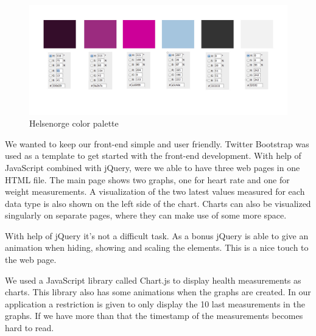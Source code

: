 \begin{figure}[h]
\centering
\includegraphics[scale=0.30]{../Figures/helsenorge_pallett.jpg}
\caption{Helsenorge color palette}
\label{figure:helsenorge-color-palette}
\end{figure}

We wanted to keep our front-end simple and user friendly.
Twitter Bootstrap was used as a template to get started with the front-end development.
With help of JavaScript combined with jQuery, were we able to have three web pages in one HTML file. 
The main page shows two graphs, one for heart rate and one for weight measurements. 
A visualization of the two latest values measured for each data type is also shown on the left side of the chart.
Charts can also be visualized singularly on separate pages, where they can make use of some more space.

With help of jQuery it's not a difficult task.
As a bonus jQuery is able to give an animation when hiding, showing and scaling the elements.
This is a nice touch to the web page.

We used a JavaScript library called Chart.js to display health measurements as charts. 
This library also has some animations when the graphs are created.
In our application a restriction is given to only display the 10 last measurements in the graphs.
If we have more than that the timestamp of the measurements becomes hard to read.

